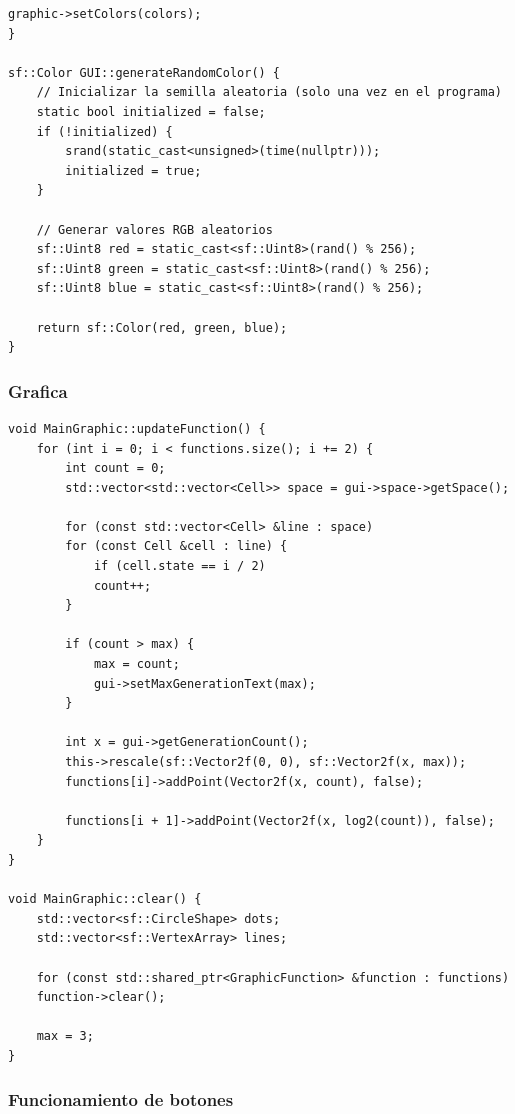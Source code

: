 \documentclass[12pt,twoside]{article}
\begin{document}
\begin{lstlisting}[caption={GUI.cpp}, label={lst:cppexample}]
	graphic->setColors(colors);
}

sf::Color GUI::generateRandomColor() {
	// Inicializar la semilla aleatoria (solo una vez en el programa)
	static bool initialized = false;
	if (!initialized) {
		srand(static_cast<unsigned>(time(nullptr)));
		initialized = true;
	}
	
	// Generar valores RGB aleatorios
	sf::Uint8 red = static_cast<sf::Uint8>(rand() % 256);
	sf::Uint8 green = static_cast<sf::Uint8>(rand() % 256);
	sf::Uint8 blue = static_cast<sf::Uint8>(rand() % 256);
	
	return sf::Color(red, green, blue);
}
\end{lstlisting}

\subsubsection{Grafica}

\begin{lstlisting}[caption={MainGraphic}, label={lst:cppexample}]
void MainGraphic::updateFunction() {
	for (int i = 0; i < functions.size(); i += 2) {
		int count = 0;
		std::vector<std::vector<Cell>> space = gui->space->getSpace();
		
		for (const std::vector<Cell> &line : space)
		for (const Cell &cell : line) {
			if (cell.state == i / 2)
			count++;
		}
		
		if (count > max) {
			max = count;
			gui->setMaxGenerationText(max);
		}
		
		int x = gui->getGenerationCount();
		this->rescale(sf::Vector2f(0, 0), sf::Vector2f(x, max));
		functions[i]->addPoint(Vector2f(x, count), false);
		
		functions[i + 1]->addPoint(Vector2f(x, log2(count)), false);
	}
}

void MainGraphic::clear() {
	std::vector<sf::CircleShape> dots;
	std::vector<sf::VertexArray> lines;
	
	for (const std::shared_ptr<GraphicFunction> &function : functions)
	function->clear();
	
	max = 3;
}
\end{lstlisting}

\subsubsection{Funcionamiento de botones}
\end{document}
